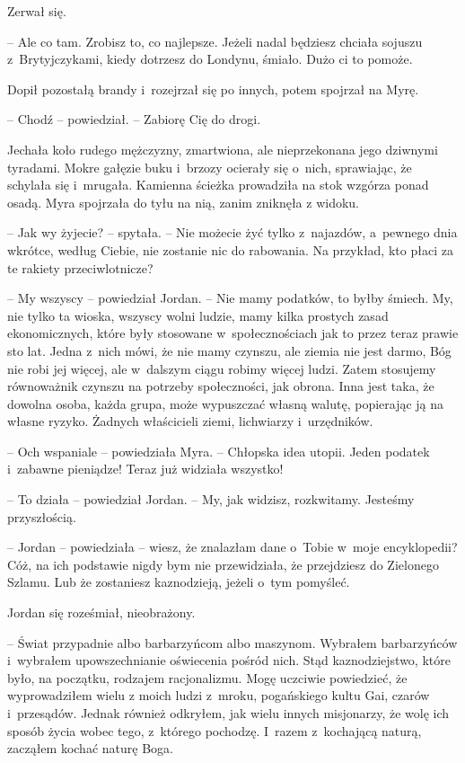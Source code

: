 \documentclass[oneside,polish,11pt,sfheadings]{mwbk}
\begin{document}
Zerwał się. 

-- Ale co tam. Zrobisz to, co najlepsze. Jeżeli nadal
będziesz chciała sojuszu z~Brytyjczykami, kiedy dotrzesz do Londynu,
śmiało. Dużo ci to pomoże.

Dopił pozostałą brandy i~rozejrzał się po innych, potem spojrzał na
Myrę. 

-- Chodź -- powiedział. -- Zabiorę Cię do drogi.

Jechała koło rudego mężczyzny, zmartwiona, ale nieprzekonana jego
dziwnymi tyradami. Mokre gałęzie buku i~brzozy ocierały się o~nich,
sprawiając, że schylała się i~mrugała. Kamienna ścieżka prowadziła na
stok wzgórza ponad osadą. Myra spojrzała do tyłu na nią, zanim zniknęła
z widoku.

-- Jak wy żyjecie? -- spytała. -- Nie możecie żyć tylko z~najazdów, a~pewnego dnia wkrótce, według Ciebie, nie zostanie nic do rabowania. Na
przykład, kto płaci za te rakiety przeciwlotnicze?

-- My wszyscy -- powiedział Jordan. -- Nie mamy podatków, to byłby śmiech.
My, nie tylko ta wioska, wszyscy wolni ludzie, mamy kilka prostych zasad
ekonomicznych, które były stosowane w~społecznościach jak to przez teraz
prawie sto lat. Jedna z~nich mówi, że nie mamy czynszu, ale ziemia nie
jest darmo, Bóg nie robi jej więcej, ale w~dalszym ciągu robimy więcej
ludzi. Zatem stosujemy równoważnik czynszu na potrzeby społeczności, jak
obrona. Inna jest taka, że dowolna osoba, każda grupa, może wypuszczać
własną walutę, popierając ją na własne ryzyko. Żadnych właścicieli
ziemi, lichwiarzy i~urzędników.

-- Och wspaniale -- powiedziała Myra. -- Chłopska idea utopii. Jeden
podatek i~zabawne pieniądze! Teraz już widziała wszystko!

-- To działa -- powiedział Jordan. -- My, jak widzisz, rozkwitamy. Jesteśmy
przyszłością.

-- Jordan -- powiedziała -- wiesz, że znalazłam dane o~Tobie w~moje
encyklopedii? Cóż, na ich podstawie nigdy bym nie przewidziała, że
przejdziesz do Zielonego Szlamu. Lub że zostaniesz kaznodzieją, jeżeli o~tym pomyśleć.

Jordan się roześmiał, nieobrażony. 

-- Świat przypadnie albo barbarzyńcom
albo maszynom. Wybrałem barbarzyńców i~wybrałem upowszechnianie
oświecenia pośród nich. Stąd kaznodziejstwo, które było, na początku,
rodzajem racjonalizmu. Mogę uczciwie powiedzieć, że wyprowadziłem wielu
z moich ludzi z~mroku, pogańskiego kultu Gai, czarów i~przesądów. Jednak
również odkryłem, jak wielu innych misjonarzy, że wolę ich sposób życia
wobec tego, z~którego pochodzę. I~razem z~kochającą naturą, zacząłem
kochać naturę Boga.
\end{document}
